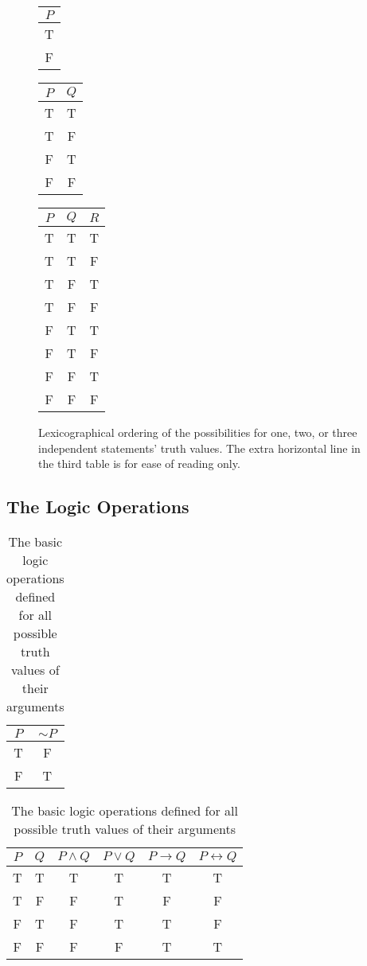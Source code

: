 \begin{figure}
\begin{center}
\begin{tabular}{|c|}\hline
$P$\\
\hline
T\\
F\\\hline\end{tabular}\qquad\qquad
\qquad \begin{tabular}{|c|c|}\hline
$P$& $Q$\\
\hline
T&T\\
T&F\\
F&T\\
F&F\\\hline \end{tabular}\qquad\qquad\qquad
\begin{tabular}{|c|c|c|}
\hline
$P$&$Q$&$R$\\
\hline
T&T&T\\
T&T&F\\
T&F&T\\
T&F&F\\
\hline
F&T&T\\
F&T&F\\
F&F&T\\
F&F&F\\
\hline
\end{tabular}\end{center}

\caption{Lexicographical ordering of the possibilities for
one, two, or three independent statements' truth values.  The extra 
horizontal line in the third table is for ease of reading only.}
\label{LexicographicalOrdersFor1,2,3StatementsFigure}
\end{figure}

\newpage
\subsection{The Logic Operations}

\begin{table}
\begin{center}

\begin{tabular}{|c||c|}
\hline
$P$&$\sim P$\\ \hline
T&F\\F&T\\ \hline\end{tabular}
\qquad\qquad\qquad
\begin{tabular}{|c|c||c|c|c|c|}
\hline
$P$&$Q$&$P\wedge Q$&$P\vee Q$&$P\rightarrow Q$&$P\leftrightarrow Q$\\
\hline
T&T&T&T&T&T\\
T&F&F&T&F&F\\
F&T&F&T&T&F\\
F&F&F&F&T&T\\
\hline
\end{tabular}
\end{center}
\caption{The basic logic operations defined for all possible 
truth values of their arguments}
\label{TalbeOfAll5LogicOperations}\end{table}

